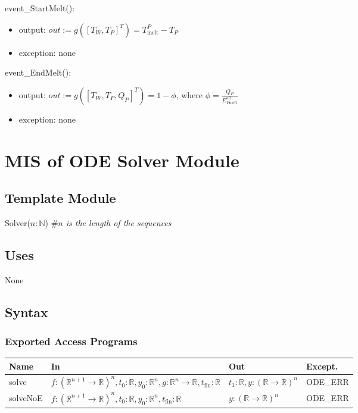 \documentclass[12pt]{article}
\begin{document}
event\_StartMelt(): 
\begin{itemize}
\item output: $out := g([T_W, T_P]^T) = T_\text{melt}^P - T_P$
\item exception: none
\end{itemize}

event\_EndMelt(): 
\begin{itemize}
\item output: $out := g([T_W, T_P, Q_P]^T) = 1 - \phi$, where $\phi = \frac{Q_P}{E_{P\text{melt}}^{\text{all}}}$
\item exception: none
\end{itemize}

\newpage
\section{MIS of ODE Solver Module} \label{ODE}

\subsection{Template Module}

Solver($n: \mathbb{N}$) \#\textit{$n$ is the length of the sequences}

\subsection{Uses}

None

\subsection{Syntax}

\subsubsection{Exported Access Programs}

\begin{center}
\begin{tabular}{p{1.5cm} >{\raggedright\arraybackslash}p{9.25cm} >{\raggedright\arraybackslash}p{2.5cm} p{1.5cm}}
  \hline
  \textbf{Name} & \textbf{In} & \textbf{Out} & \textbf{Except.} \\
  \hline
  solve & $f: (\mathbb{R}^{n+1} \rightarrow \mathbb{R})^n, t_0 : \mathbb{R},
          y_0: \mathbb{R}^n, g: \mathbb{R}^n \rightarrow \mathbb{R},
          t_\text{fin}: \mathbb{R}$ & $t_1: \mathbb{R}, 
                                      y:
                                      (\mathbb{R}
                                      \rightarrow
                                      \mathbb{R})^n$ & ODE\_ERR\\
  solveNoE & $f: (\mathbb{R}^{n+1} \rightarrow \mathbb{R})^n, t_0 : \mathbb{R},
             y_0: \mathbb{R}^n, t_\text{fin}: \mathbb{R}$ & $y: (\mathbb{R}
                                                            \rightarrow
                                                            \mathbb{R})^n$ & ODE\_ERR\\

  \hline 
\end{tabular}
\end{center}
\end{document}
